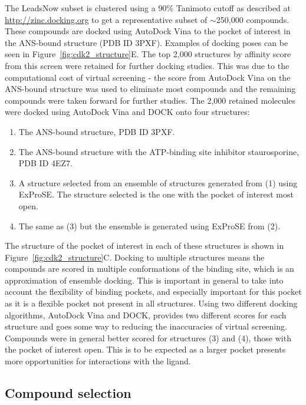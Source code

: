 The LeadsNow subset is clustered using a 90\% Tanimoto cutoff as described at \url{http://zinc.docking.org} to get a representative subset of $\sim$250,000 compounds.
These compounds are docked using AutoDock Vina \cite{Trott2010} to the pocket of interest in the ANS-bound structure (PDB ID 3PXF).
Examples of docking poses can be seen in Figure~\ref{fig:cdk2_structure}E.
The top 2,000 structures by affinity score from this screen were retained for further docking studies.
This was due to the computational cost of virtual screening - the score from AutoDock Vina on the ANS-bound structure was used to eliminate most compounds and the remaining compounds were taken forward for further studies.
The 2,000 retained molecules were docked using AutoDock Vina and DOCK \cite{Allen2015} onto four structures:
\begin{enumerate}
\item The ANS-bound structure, PDB ID 3PXF.
\item The ANS-bound structure with the ATP-binding site inhibitor staurosporine, PDB ID 4EZ7.
\item A structure selected from an ensemble of structures generated from (1) using ExProSE.
The structure selected is the one with the pocket of interest most open.
\item The same as (3) but the ensemble is generated using ExProSE from (2).
\end{enumerate}
The structure of the pocket of interest in each of these structures is shown in Figure~\ref{fig:cdk2_structure}C.
Docking to multiple structures means the compounds are scored in multiple conformations of the binding site, which is an approximation of ensemble docking.
This is important in general to take into account the flexibility of binding pockets, and especially important for this pocket as it is a flexible pocket not present in all structures.
Using two different docking algorithms, AutoDock Vina and DOCK, provides two different scores for each structure and goes some way to reducing the inaccuracies of virtual screening.
Compounds were in general better scored for structures (3) and (4), those with the pocket of interest open.
This is to be expected as a larger pocket presents more opportunities for interactions with the ligand.


\subsection{Compound selection}


